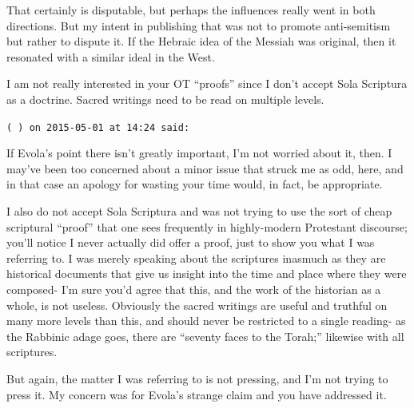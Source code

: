 \begin{footnotesize}
\begin{sffamily}
That certainly is disputable, but perhaps the influences really went in both directions. But my intent in publishing that was not to promote anti-semitism but rather to dispute it. If the Hebraic idea of the Messiah was original, then it resonated with a similar ideal in the West.

I am not really interested in your OT ``proofs'' since I don't accept Sola Scriptura as a doctrine. Sacred writings need to be read on multiple levels.

\hfill

\texttt{( ) on 2015-05-01 at 14:24 said:}

If Evola's point there isn't greatly important, I'm not worried about it, then. I may've been too concerned about a minor issue that struck me as odd, here, and in that case an apology for wasting your time would, in fact, be appropriate.

I also do not accept Sola Scriptura and was not trying to use the sort of cheap scriptural ``proof'' that one sees frequently in highly-modern Protestant discourse; you'll notice I never actually did offer a proof, just to show you what I was referring to. I was merely speaking about the scriptures inasmuch as they are historical documents that give us insight into the time and place where they were composed- I'm sure you'd agree that this, and the work of the historian as a whole, is not useless. Obviously the sacred writings are useful and truthful on many more levels than this, and should never be restricted to a single reading- as the Rabbinic adage goes, there are ``seventy faces to the Torah;'' likewise with all scriptures.

But again, the matter I was referring to is not pressing, and I'm not trying to press it. My concern was for Evola's strange claim and you have addressed it.


\hfill

\end{sffamily}
\end{footnotesize}

